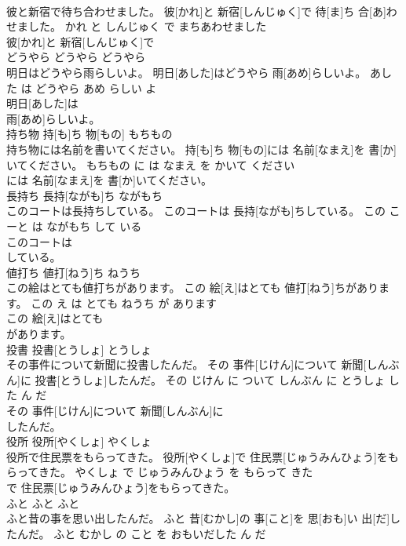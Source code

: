 \documentclass[8pt]{extreport}
\begin{document}
\begin{CJK}{UTF8}{min}
\\	彼と新宿で待ち合わせました。	彼[かれ]と 新宿[しんじゅく]で 待[ま]ち 合[あ]わせました。	かれ と しんじゅく で まちあわせました	
\\	彼[かれ]と 新宿[しんじゅく]で
\\	どうやら	どうやら	どうやら	
\\	明日はどうやら雨らしいよ。	明日[あした]はどうやら 雨[あめ]らしいよ。	あした は どうやら あめ らしい よ	
\\	明日[あした]は
\\	雨[あめ]らしいよ。			
\\	持ち物	持[も]ち 物[もの]	もちもの	
\\	持ち物には名前を書いてください。	持[も]ち 物[もの]には 名前[なまえ]を 書[か]いてください。	もちもの に は なまえ を かいて ください	
\\	には 名前[なまえ]を 書[か]いてください。			
\\	長持ち	長持[ながも]ち	ながもち	
\\	このコートは長持ちしている。	このコートは 長持[ながも]ちしている。	この こーと は ながもち して いる	
\\	このコートは
\\	している。			
\\	値打ち	値打[ねう]ち	ねうち	
\\	この絵はとても値打ちがあります。	この 絵[え]はとても 値打[ねう]ちがあります。	この え は とても ねうち が あります	
\\	この 絵[え]はとても
\\	があります。			
\\	投書	投書[とうしょ]	とうしょ	
\\	その事件について新聞に投書したんだ。	その 事件[じけん]について 新聞[しんぶん]に 投書[とうしょ]したんだ。	その じけん に ついて しんぶん に とうしょ した ん だ	
\\	その 事件[じけん]について 新聞[しんぶん]に
\\	したんだ。			
\\	役所	役所[やくしょ]	やくしょ	
\\	役所で住民票をもらってきた。	役所[やくしょ]で 住民票[じゅうみんひょう]をもらってきた。	やくしょ で じゅうみんひょう を もらって きた	
\\	で 住民票[じゅうみんひょう]をもらってきた。			
\\	ふと	ふと	ふと	
\\	ふと昔の事を思い出したんだ。	ふと 昔[むかし]の 事[こと]を 思[おも]い 出[だ]したんだ。	ふと むかし の こと を おもいだした ん だ	

\end{CJK}
\end{document}
